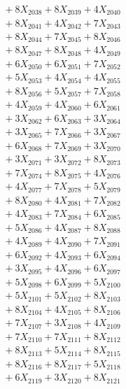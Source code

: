 \documentclass[a4paper,10pt]{article}
\begin{document}
{\begin{align}
&\;  + 8 X_{2038} + 8 X_{2039} + 4 X_{2040} \\[0.3ex]
&\;  + 8 X_{2041} + 4 X_{2042} + 7 X_{2043} \\[0.3ex]
&\;  + 8 X_{2044} + 7 X_{2045} + 8 X_{2046} \\[0.3ex]
&\;  + 8 X_{2047} + 8 X_{2048} + 4 X_{2049} \\[0.5ex]\allowbreak
&\;  + 6 X_{2050} + 6 X_{2051} + 7 X_{2052} \\[0.3ex]
&\;  + 5 X_{2053} + 4 X_{2054} + 4 X_{2055} \\[0.3ex]
&\;  + 8 X_{2056} + 5 X_{2057} + 7 X_{2058} \\[0.3ex]
&\;  + 4 X_{2059} + 4 X_{2060} + 6 X_{2061} \\[0.3ex]
&\;  + 3 X_{2062} + 6 X_{2063} + 3 X_{2064} \\[0.3ex]
&\;  + 3 X_{2065} + 7 X_{2066} + 3 X_{2067} \\[0.3ex]
&\;  + 6 X_{2068} + 7 X_{2069} + 3 X_{2070} \\[0.3ex]
&\;  + 3 X_{2071} + 3 X_{2072} + 8 X_{2073} \\[0.3ex]
&\;  + 7 X_{2074} + 8 X_{2075} + 4 X_{2076} \\[0.3ex]
&\;  + 4 X_{2077} + 7 X_{2078} + 5 X_{2079} \\[0.5ex]\allowbreak
&\;  + 8 X_{2080} + 4 X_{2081} + 7 X_{2082} \\[0.3ex]
&\;  + 4 X_{2083} + 7 X_{2084} + 6 X_{2085} \\[0.3ex]
&\;  + 5 X_{2086} + 4 X_{2087} + 8 X_{2088} \\[0.3ex]
&\;  + 4 X_{2089} + 4 X_{2090} + 7 X_{2091} \\[0.3ex]
&\;  + 6 X_{2092} + 4 X_{2093} + 6 X_{2094} \\[0.3ex]
&\;  + 3 X_{2095} + 4 X_{2096} + 6 X_{2097} \\[0.3ex]
&\;  + 5 X_{2098} + 6 X_{2099} + 5 X_{2100} \\[0.3ex]
&\;  + 5 X_{2101} + 5 X_{2102} + 8 X_{2103} \\[0.3ex]
&\;  + 8 X_{2104} + 4 X_{2105} + 8 X_{2106} \\[0.3ex]
&\;  + 7 X_{2107} + 3 X_{2108} + 4 X_{2109} \\[0.5ex]\allowbreak
&\;  + 7 X_{2110} + 7 X_{2111} + 8 X_{2112} \\[0.3ex]
&\;  + 8 X_{2113} + 5 X_{2114} + 8 X_{2115} \\[0.3ex]
&\;  + 8 X_{2116} + 8 X_{2117} + 5 X_{2118} \\[0.3ex]
&\;  + 6 X_{2119} + 3 X_{2120} + 8 X_{2121} \\[0.3ex]

\end{align}}
\end{document}
